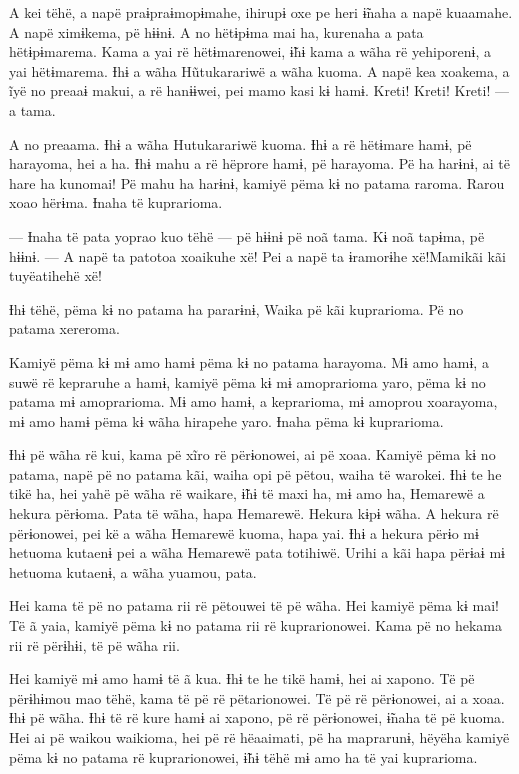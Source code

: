 A kei tëhë, a napë praɨpraɨmopɨmahe, ihirupɨ oxe pe heri ɨ̃naha a napë
kuaamahe. A napë ximɨkema, pë hɨɨnɨ. A no hëtɨpɨma mai ha, kurenaha a
pata hëtɨpɨmarema. Kama a yai rë hëtɨmarenowei, ɨ̃hɨ kama a wãha rë
yehiporenɨ, a yai hëtɨmarema. Ɨhɨ a wãha Hũtukarariwë a wãha kuoma. A napë kea xoakema, a ĩyë no preaaɨ makui, a rë hanɨɨwei, pei mamo kasi kɨ
hamɨ. Kreti! Kreti! Kreti! --- a tama.

A no preaama. Ɨhɨ a wãha Hutukarariwë kuoma. Ɨhɨ a rë hëtɨmare hamɨ, pë
harayoma, hei a ha. Ɨhɨ mahu a rë hëprore hamɨ, pë harayoma. Pë ha
harɨnɨ, ai të hare ha kunomai! Pë mahu ha harɨnɨ, kamiyë pëma kɨ no
patama raroma. Rarou xoao hërɨma. Ɨnaha të kuprarioma. 

--- Ɨnaha të pata yoprao kuo tëhë --- pë hɨɨnɨ pë noã tama. Kɨ noã
tapɨma, pë hɨɨnɨ. --- A napë ta patotoa xoaikuhe xë! Pei a napë ta
ɨramorɨhe xë!Mamikãi kãi tuyëatihehë xë!

Ɨhɨ tëhë, pëma kɨ no patama ha pararɨnɨ, Waika pë kãi kuprarioma. Pë no
patama xereroma. 

Kamiyë pëma kɨ mɨ amo hamɨ pëma kɨ no patama harayoma. Mɨ amo hamɨ, a
suwë rë kepraruhe a hamɨ, kamiyë pëma kɨ mɨ amoprarioma yaro, pëma kɨ no
patama mɨ amoprarioma. Mɨ amo hamɨ, a keprarioma, mɨ amoprou xoarayoma,
mɨ amo hamɨ pëma kɨ wãha hirapehe yaro. Ɨnaha pëma kɨ kuprarioma. 

Ɨhɨ pë wãha rë kui, kama pë xĩro rë përɨonowei, ai pë xoaa. Kamiyë pëma
kɨ no patama, napë pë no patama kãi, waiha opi pë pëtou, waiha të
warokei. Ɨhɨ te he tikë ha, hei yahë pë wãha rë waikare, ɨ̃hɨ të maxi ha,
mɨ amo ha, Hemarewë a hekura përɨoma. Pata të wãha, hapa Hemarewë.
Hekura kɨpɨ wãha. A hekura rë përɨonowei, pei kë a wãha Hemarewë kuoma,
hapa yai. Ɨhɨ a hekura përɨo mɨ hetuoma kutaenɨ pei a wãha Hemarewë pata
totihiwë. Urihi a kãi hapa përɨaɨ mɨ hetuoma kutaenɨ, a wãha yuamou,
pata. 

Hei kama të pë no patama rii rë pëtouwei të pë wãha. Hei kamiyë pëma kɨ
mai! Të ã yaia, kamiyë pëma kɨ no patama rii rë kuprarionowei. Kama pë
no hekama rii rë përɨhɨi, të pë wãha rii. 

Hei kamiyë mɨ amo hamɨ të ã kua. Ɨhɨ te he tikë hamɨ, hei ai xapono. Të
pë përɨhɨmou mao tëhë, kama të pë rë pëtarionowei. Të pë rë përɨonowei,
ai a xoaa. Ɨhɨ pë wãha. Ɨhɨ të rë kure hamɨ ai xapono, pë rë përɨonowei,
ɨ̃naha të pë kuoma. Hei ai pë waikou waikioma, hei pë rë hëaaimati, pë ha
maprarunɨ, hëyëha kamiyë pëma kɨ no patama rë kuprarionowei, ɨ̃hɨ tëhë mɨ
amo ha të yai kuprarioma. 

